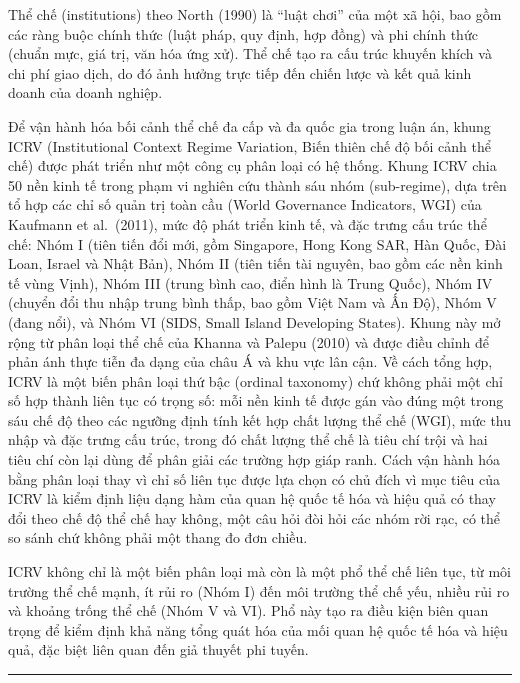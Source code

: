 \documentclass[
  a4paper,
  13pt]{extreport}
\begin{document}
Thể chế (institutions) theo North (1990) là ``luật chơi'' của một xã
hội, bao gồm các ràng buộc chính thức (luật pháp, quy định, hợp đồng) và
phi chính thức (chuẩn mực, giá trị, văn hóa ứng xử). Thể chế tạo ra cấu
trúc khuyến khích và chi phí giao dịch, do đó ảnh hưởng trực tiếp đến
chiến lược và kết quả kinh doanh của doanh nghiệp.

Để vận hành hóa bối cảnh thể chế đa cấp và đa quốc gia trong luận án,
khung ICRV (Institutional Context Regime Variation, Biến thiên chế độ
bối cảnh thể chế) được phát triển như một công cụ phân loại có hệ thống.
Khung ICRV chia 50 nền kinh tế trong phạm vi nghiên cứu thành sáu nhóm
(sub-regime), dựa trên tổ hợp các chỉ số quản trị toàn cầu (World
Governance Indicators, WGI) của Kaufmann et al.~(2011), mức độ phát
triển kinh tế, và đặc trưng cấu trúc thể chế: Nhóm I (tiên tiến đổi mới,
gồm Singapore, Hong Kong SAR, Hàn Quốc, Đài Loan, Israel và Nhật Bản),
Nhóm II (tiên tiến tài nguyên, bao gồm các nền kinh tế vùng Vịnh), Nhóm
III (trung bình cao, điển hình là Trung Quốc), Nhóm IV (chuyển đổi thu
nhập trung bình thấp, bao gồm Việt Nam và Ấn Độ), Nhóm V (đang nổi), và
Nhóm VI (SIDS, Small Island Developing States). Khung này mở rộng từ
phân loại thể chế của Khanna và Palepu (2010) và được điều chỉnh để phản
ánh thực tiễn đa dạng của châu Á và khu vực lân cận. Về cách tổng hợp,
ICRV là một biến phân loại thứ bậc (ordinal taxonomy) chứ không phải một
chỉ số hợp thành liên tục có trọng số: mỗi nền kinh tế được gán vào đúng
một trong sáu chế độ theo các ngưỡng định tính kết hợp chất lượng thể
chế (WGI), mức thu nhập và đặc trưng cấu trúc, trong đó chất lượng thể
chế là tiêu chí trội và hai tiêu chí còn lại dùng để phân giải các
trường hợp giáp ranh. Cách vận hành hóa bằng phân loại thay vì chỉ số
liên tục được lựa chọn có chủ đích vì mục tiêu của ICRV là kiểm định
liệu dạng hàm của quan hệ quốc tế hóa và hiệu quả có thay đổi theo chế
độ thể chế hay không, một câu hỏi đòi hỏi các nhóm rời rạc, có thể so
sánh chứ không phải một thang đo đơn chiều.

ICRV không chỉ là một biến phân loại mà còn là một phổ thể chế liên tục,
từ môi trường thể chế mạnh, ít rủi ro (Nhóm I) đến môi trường thể chế
yếu, nhiều rủi ro và khoảng trống thể chế (Nhóm V và VI). Phổ này tạo ra
điều kiện biên quan trọng để kiểm định khả năng tổng quát hóa của mối
quan hệ quốc tế hóa và hiệu quả, đặc biệt liên quan đến giả thuyết phi
tuyến.

\begin{center}\rule{0.5\linewidth}{0.5pt}\end{center}
\end{document}
